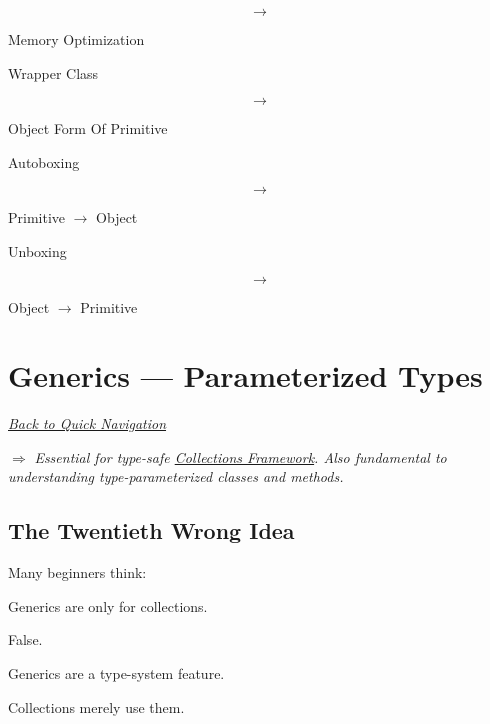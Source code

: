 \documentclass[11pt,a4paper]{book}
\begin{document}
\[
\rightarrow
\]

Memory Optimization


Wrapper Class

\[
\rightarrow
\]

Object Form Of Primitive


Autoboxing

\[
\rightarrow
\]

Primitive $\rightarrow$ Object


Unboxing

\[
\rightarrow
\]

Object $\rightarrow$ Primitive

\chapter{Generics --- Parameterized Types}\label{chap:generics}

\smallskip
\noindent
\hyperref[sec:quick_nav]{\emph{Back to Quick Navigation}}

\smallskip
\noindent
\textcolor{RosettaRoyalPurple}{$\Rightarrow$}
\emph{Essential for type-safe \hyperref[chap:collections]{Collections Framework}. Also fundamental to understanding type-parameterized classes and methods.}


\section{The Twentieth Wrong Idea}

\begin{trap}

Many beginners think:

Generics are only for collections.

False.


Generics are a type-system feature.

Collections merely use them.

\end{trap}
\end{document}
